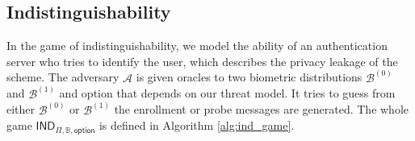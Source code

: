 

\subsection{Indistinguishability}
\label{sec:ind_game}

In the game of indistinguishability, we model the ability of an authentication server who tries to identify the user, which describes the privacy leakage of the scheme. The adversary $\mathcal{A}$ is given oracles to two biometric distributions $\mathcal{B}^{(0)}$ and $ \mathcal{B}^{(1)}$ and \textsf{option} that depends on our threat model. It tries to guess from either $\mathcal{B}^{(0)}$ or $ \mathcal{B}^{(1)}$ the enrollment or probe messages are generated. The whole game $\textsf{IND}_{\Pi, \mathbb{B}, \textsf{option}}$ is defined in Algorithm \ref{alg:ind_game}.

